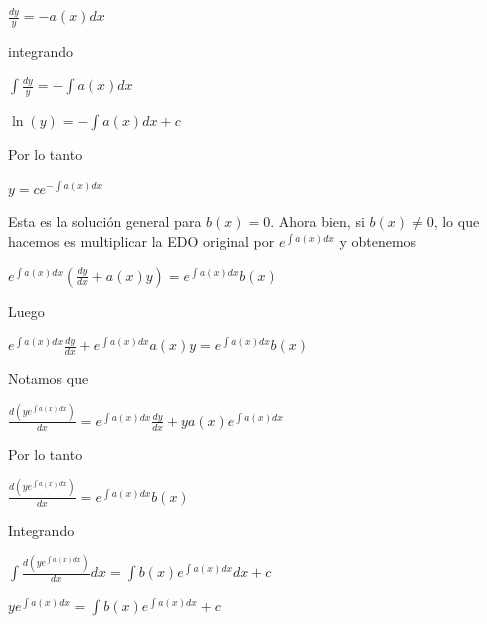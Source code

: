 \documentclass{article}
\theoremstyle{plain}
\theoremstyle{definition}
\begin{document}
\begin{center}
$\displaystyle \frac{dy}{y}=-a(x)dx$
\end{center}

integrando


\begin{center}
$\displaystyle \int\frac{dy}{y}=- \int a(x)dx$
\end{center}

\begin{center}
$\displaystyle \ln(y)=- \int a(x)dx +c$
\end{center}

Por lo tanto

\begin{center}
$\displaystyle y= c e^{- \int a(x)dx} $
\end{center}

Esta es la solución general para $b(x)=0$. Ahora bien, si $b(x) \neq 0$, lo que hacemos es multiplicar la EDO original por $e^{ \int a(x)dx}$ y obtenemos


\begin{center}
$\displaystyle e^{ \int a(x)dx}\left( \frac{dy}{dx}+a(x)y\right) =e^{ \int a(x)dx}b(x)$
\end{center}

Luego

\begin{center}
$\displaystyle e^{ \int a(x)dx} \frac{dy}{dx}+e^{ \int a(x)dx} a(x)y =e^{ \int a(x)dx}b(x)$
\end{center}

Notamos que


\begin{center}
$\displaystyle \frac{d \left( ye^{ \int a(x)dx}\right) }{dx} = e^{ \int a(x)dx}\frac{dy}{dx}+ y a(x)e^{ \int a(x)dx}$
\end{center}

Por lo tanto

\begin{center}
$\displaystyle \frac{d \left( ye^{ \int a(x)dx}\right) }{dx} =e^{ \int a(x)dx}b(x)$
\end{center}

Integrando

\begin{center}
$  \displaystyle \int \frac{d \left( ye^{ \int a(x)dx}\right) }{dx} dx = \int b(x) e^{ \int a(x)dx}dx +c$
\end{center}


\begin{center}
$\displaystyle ye^{ \int a(x)dx} = \int b(x) e^{ \int a(x)dx} +c$
\end{center}
\end{document}
